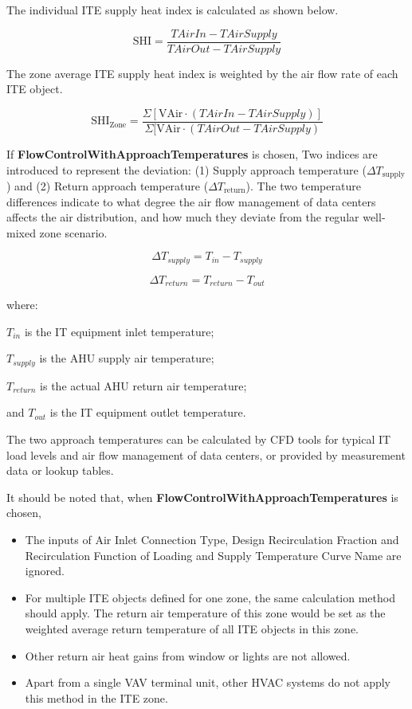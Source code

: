 The individual ITE supply heat index is calculated as shown below.

\begin{equation}
\textrm{SHI} = \frac{TAirIn - TAirSupply}{TAirOut - TAirSupply}
\end{equation}

The zone average ITE supply heat index is weighted by the air flow rate of each ITE object.

\begin{equation}
\textrm{SHI}_{\textrm{Zone}} = \frac{\Sigma[\textrm{VAir} \cdot (TAirIn - TAirSupply)]}{\Sigma[\textrm{VAir} \cdot (TAirOut - TAirSupply)}
\end{equation}

If \textbf{FlowControlWithApproachTemperatures} is chosen, Two indices are introduced to represent the deviation: (1) Supply approach temperature ($\Delta T_{\textrm{supply}}$) and (2) Return approach temperature ($\Delta T_{\textrm{return}}$). The two temperature differences indicate to what degree the air flow management of data centers affects the air distribution, and how much they deviate from the regular well-mixed zone scenario.

\begin{equation}
\Delta T_{supply}=T_{in}-T_{supply}
\end{equation}

\begin{equation}
\Delta T_{return}=T_{return}-T_{out}
\end{equation}

where:

$T_{in}$ is the IT equipment inlet temperature;

$T_{supply}$ is the AHU supply air temperature;

$T_{return}$ is the actual AHU return air temperature;

and $T_{out}$ is the IT equipment outlet temperature.

The two approach temperatures can be calculated by CFD tools for typical IT load levels and air flow management of data centers, or provided by measurement data or lookup tables. 

It should be noted that, when \textbf{FlowControlWithApproachTemperatures} is chosen, 

\begin{itemize}
\item The inputs of Air Inlet Connection Type, Design Recirculation Fraction and Recirculation Function of Loading and Supply Temperature Curve Name are ignored.
\item For multiple ITE objects defined for one zone, the same calculation method should apply. The return air temperature of this zone would be set as the weighted average return temperature of all ITE objects in this zone.
\item Other return air heat gains from window or lights are not allowed.
\item Apart from a single VAV terminal unit, other HVAC systems do not apply this method in the ITE zone.
\end{itemize}


